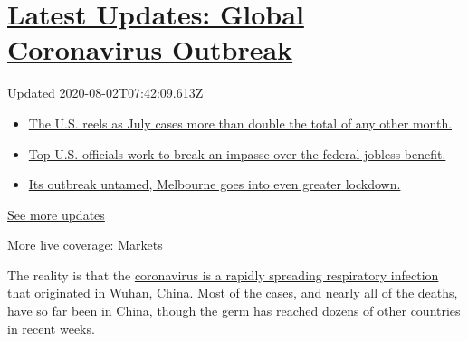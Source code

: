 \hypertarget{latest-updates-global-coronavirus-outbreak}{%
\section{\texorpdfstring{\href{https://www.nytimes.com/2020/08/01/world/coronavirus-covid-19.html?action=click\&pgtype=Article\&state=default\&region=MAIN_CONTENT_1\&context=storylines_live_updates}{Latest
Updates: Global Coronavirus
Outbreak}}{Latest Updates: Global Coronavirus Outbreak}}\label{latest-updates-global-coronavirus-outbreak}}

Updated 2020-08-02T07:42:09.613Z

\begin{itemize}
\tightlist
\item
  \href{https://www.nytimes.com/2020/08/01/world/coronavirus-covid-19.html?action=click\&pgtype=Article\&state=default\&region=MAIN_CONTENT_1\&context=storylines_live_updates\#link-34047410}{The
  U.S. reels as July cases more than double the total of any other
  month.}
\item
  \href{https://www.nytimes.com/2020/08/01/world/coronavirus-covid-19.html?action=click\&pgtype=Article\&state=default\&region=MAIN_CONTENT_1\&context=storylines_live_updates\#link-780ec966}{Top
  U.S. officials work to break an impasse over the federal jobless
  benefit.}
\item
  \href{https://www.nytimes.com/2020/08/01/world/coronavirus-covid-19.html?action=click\&pgtype=Article\&state=default\&region=MAIN_CONTENT_1\&context=storylines_live_updates\#link-2bc8948}{Its
  outbreak untamed, Melbourne goes into even greater lockdown.}
\end{itemize}

\href{https://www.nytimes.com/2020/08/01/world/coronavirus-covid-19.html?action=click\&pgtype=Article\&state=default\&region=MAIN_CONTENT_1\&context=storylines_live_updates}{See
more updates}

More live coverage:
\href{https://www.nytimes.com/live/2020/07/31/business/stock-market-today-coronavirus?action=click\&pgtype=Article\&state=default\&region=MAIN_CONTENT_1\&context=storylines_live_updates}{Markets}

The reality is that the
\href{https://www.nytimes.com/article/what-is-coronavirus.html?action=click\&pgtype=Article\&state=default\&module=styln-coronavirus\&variant=show\&region=MID_MAIN_CONTENT\&context=storyline_guide}{coronavirus
is a rapidly spreading respiratory infection} that originated in Wuhan,
China. Most of the cases, and nearly all of the deaths, have so far been
in China, though the germ has reached dozens of other countries in
recent weeks.

